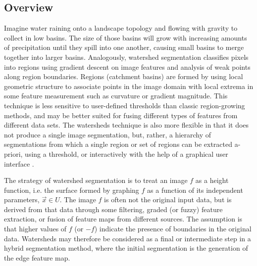 %
%
%
%

\subsection{Overview}
\label{sec:AboutWatersheds}

Imagine water raining onto a landscape topology and flowing with gravity to
collect in low basins.  The size of those basins will grow with increasing
amounts of precipitation until they spill into one another, causing small
basins to merge together into larger basins.  Analogously, watershed
segmentation classifies pixels into regions using gradient descent on image
features and analysis of weak points along region boundaries. Regions
(catchment basins) are formed by using local geometric structure to associate
points in the image domain with local extrema in some feature measurement such
as curvature or gradient magnitude.  This technique is less sensitive to
user-defined thresholds than classic region-growing methods, and may be better
suited for fusing different types of features from different data sets.  The
watersheds technique is also more flexible in that it does not produce a single
image segmentation, but, rather, a hierarchy of segmentations from which a
single region or set of regions can be extracted a-priori, using a threshold,
or interactively with the help of a graphical user interface
\cite{Yoo1992,Yoo1991}.

The strategy of watershed segmentation is to treat an image $f$ as a height
function, i.e.  the surface formed by graphing $f$ as a function of its
independent parameters, $\vec{x} \in U$.  The image $f$ is often not the
original input data, but is derived from that data through some filtering,
graded (or fuzzy) feature extraction, or fusion of feature maps from different
sources.  The assumption is that higher values of $f$ (or $-f$) indicate the
presence of boundaries in the original data.  Watersheds may therefore be
considered as a final or intermediate step in a hybrid segmentation method,
where the initial segmentation is the generation of the edge feature map.

